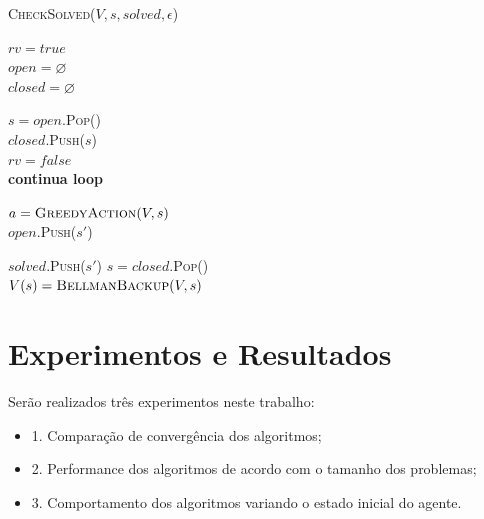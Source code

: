 \documentclass[letterpaper]{article}
\begin{document}
\linesnumbered
\begin{algorithm}[t]
{
	\caption{\textsc{CheckSolved}($ V, s, \textit{solved}, \epsilon $) }
	\label{alg:checksolved}
    $ \textit{rv} = true $\\
    $ \textit{open} = \varnothing $\\
    $ \textit{closed} = \varnothing $\\

    {
        $s = \textit{open}$.\textsc{Pop}() \\
        $\textit{closed}$.\textsc{Push}($s$) \\

        {
            $ \textit{rv} = false $\\
            \textbf{continua loop}
        }

        $a = \textsc{GreedyAction}(V, s)$ \\

        {
            {
                $\textit{open}$.\textsc{Push}($s'$)
            }
        }
    }

    {
        {
            $\textit{solved}$.\textsc{Push}($s'$)
        }
    }
    {
        {
            $ s = \textit{closed}$.\textsc{Pop}()\\
            $V(s) = \textsc{BellmanBackup}(V, s)$ \\
        }
    }

}
\end{algorithm}



\section{Experimentos e Resultados}

Serão realizados três experimentos neste trabalho:

\begin{itemize}
    \item 1. Comparação de convergência dos algoritmos;
    \item 2. Performance dos algoritmos de acordo com o tamanho dos problemas;
    \item 3. Comportamento dos algoritmos variando o estado inicial do agente.
\end{itemize}
\end{document}
